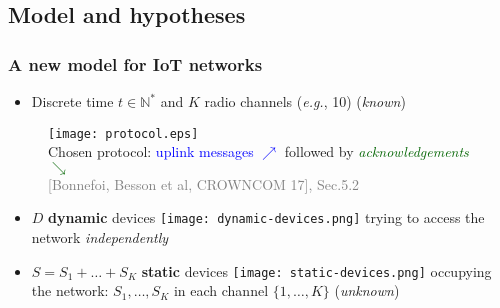 \subsection{Model and hypotheses}

\subsubsection{A new model for IoT networks}

\begin{frameO}

    \begin{itemize}
        \item
              Discrete time \(t\in\mathbb{N}^*\) and \(K\) radio channels (\emph{e.g.}, 10)
              \hfill{} (\emph{known})
    \end{itemize}

    \begin{figure}[h!]
        \centering
        \texttt{[image: protocol.eps]}\\
        
        {\small Chosen protocol: \textcolor{blue}{uplink messages {\large $\nearrow$}} followed by \textcolor{darkgreen}{\emph{acknowledgements} {\large $\searrow$}}}\\
        \hfill{} {\tiny \textcolor{gray}{[Bonnefoi, Besson et al, CROWNCOM 17], Sec.5.2}}
    \end{figure}

    \begin{itemize}
        \item
              \(D\) \textbf{dynamic} devices \texttt{[image: dynamic-devices.png]} trying to access the network \emph{independently}
        \item
              \(S=S_1+\dots+S_{K}\) \textbf{static} devices \texttt{[image: static-devices.png]} occupying the network:
              \newline
              \(S_1,\dots,S_{K}\) in each channel \(\{1,\dots,K\}\) \hfill{} (\emph{unknown})
    \end{itemize}

\end{frameO}


\begin{frameO}

    \begin{center}
    \end{center}

\end{frameO}


